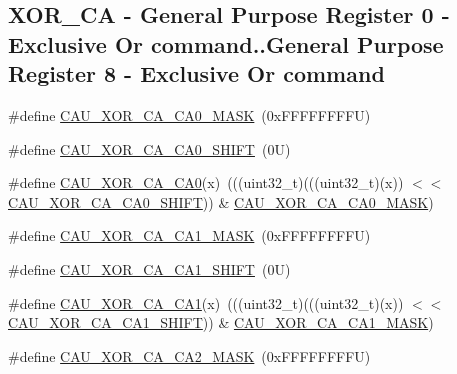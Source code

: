 \subsection*{X\+O\+R\+\_\+\+CA -\/ General Purpose Register 0 -\/ Exclusive Or command..General Purpose Register 8 -\/ Exclusive Or command}
\begin{DoxyCompactItemize}
\item 
\#define \mbox{\hyperlink{group___c_a_u___register___masks_ga1b5b9a631549a09772404a13cc8bb2c6}{C\+A\+U\+\_\+\+X\+O\+R\+\_\+\+C\+A\+\_\+\+C\+A0\+\_\+\+M\+A\+SK}}~(0x\+F\+F\+F\+F\+F\+F\+F\+F\+U)
\item 
\#define \mbox{\hyperlink{group___c_a_u___register___masks_ga668e19ef62b1ef693c25a076b8102ad1}{C\+A\+U\+\_\+\+X\+O\+R\+\_\+\+C\+A\+\_\+\+C\+A0\+\_\+\+S\+H\+I\+FT}}~(0\+U)
\item 
\#define \mbox{\hyperlink{group___c_a_u___register___masks_gaf21ab1d961463e2f4288e40a44f3cb83}{C\+A\+U\+\_\+\+X\+O\+R\+\_\+\+C\+A\+\_\+\+C\+A0}}(x)~(((uint32\+\_\+t)(((uint32\+\_\+t)(x)) $<$$<$ \mbox{\hyperlink{group___c_a_u___register___masks_ga668e19ef62b1ef693c25a076b8102ad1}{C\+A\+U\+\_\+\+X\+O\+R\+\_\+\+C\+A\+\_\+\+C\+A0\+\_\+\+S\+H\+I\+FT}})) \& \mbox{\hyperlink{group___c_a_u___register___masks_ga1b5b9a631549a09772404a13cc8bb2c6}{C\+A\+U\+\_\+\+X\+O\+R\+\_\+\+C\+A\+\_\+\+C\+A0\+\_\+\+M\+A\+SK}})
\item 
\#define \mbox{\hyperlink{group___c_a_u___register___masks_ga9aaaf6dc6a0bb9f82e566fbc29dc9f2c}{C\+A\+U\+\_\+\+X\+O\+R\+\_\+\+C\+A\+\_\+\+C\+A1\+\_\+\+M\+A\+SK}}~(0x\+F\+F\+F\+F\+F\+F\+F\+F\+U)
\item 
\#define \mbox{\hyperlink{group___c_a_u___register___masks_gae0c5144e0bc6b1bc363388cc0724ad4a}{C\+A\+U\+\_\+\+X\+O\+R\+\_\+\+C\+A\+\_\+\+C\+A1\+\_\+\+S\+H\+I\+FT}}~(0\+U)
\item 
\#define \mbox{\hyperlink{group___c_a_u___register___masks_ga76cb28e96e7397374f2da8d835304611}{C\+A\+U\+\_\+\+X\+O\+R\+\_\+\+C\+A\+\_\+\+C\+A1}}(x)~(((uint32\+\_\+t)(((uint32\+\_\+t)(x)) $<$$<$ \mbox{\hyperlink{group___c_a_u___register___masks_gae0c5144e0bc6b1bc363388cc0724ad4a}{C\+A\+U\+\_\+\+X\+O\+R\+\_\+\+C\+A\+\_\+\+C\+A1\+\_\+\+S\+H\+I\+FT}})) \& \mbox{\hyperlink{group___c_a_u___register___masks_ga9aaaf6dc6a0bb9f82e566fbc29dc9f2c}{C\+A\+U\+\_\+\+X\+O\+R\+\_\+\+C\+A\+\_\+\+C\+A1\+\_\+\+M\+A\+SK}})
\item 
\#define \mbox{\hyperlink{group___c_a_u___register___masks_ga710ad3a23664ea7f219a37d7a5402362}{C\+A\+U\+\_\+\+X\+O\+R\+\_\+\+C\+A\+\_\+\+C\+A2\+\_\+\+M\+A\+SK}}~(0x\+F\+F\+F\+F\+F\+F\+F\+F\+U)

\end{DoxyCompactItemize}
